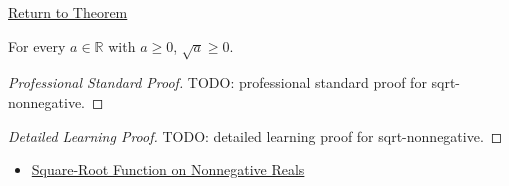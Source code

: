 \newpage
{}
\label{prf:sqrt-nonnegative}

\begin{remark*}[Return]
\hyperref[thm:sqrt-nonnegative]{Return to Theorem}
\end{remark*}

\begin{theorem*}
For every $a\in\mathbb{R}$ with $a\ge0$, $\sqrt a\ge0$.
\end{theorem*}

\begin{proof}[Professional Standard Proof]
\LRAProofBodyStart
TODO: professional standard proof for sqrt-nonnegative.
\end{proof}

\begin{proof}[Detailed Learning Proof]
\LRAProofBodyStart
TODO: detailed learning proof for sqrt-nonnegative.
\end{proof}

\begin{remark*}
\end{remark*}

\begin{dependencies}
\begin{itemize}
  \item \hyperref[def:real-square-root-function]{Square-Root Function on Nonnegative Reals}
\end{itemize}
\end{dependencies}

\clearpage
